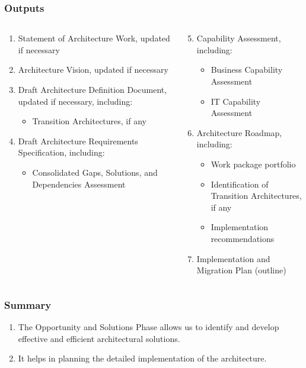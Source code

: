 \documentclass[aspectratio=169, table]{beamer}
\begin{document}
	\begin{frame}
		\frametitle{Outputs}
		\vspace{25pt}
		\begin{columns}[onlytextwidth]
			\begin{column}{0.50\textwidth}
				\begin{enumerate}
					\item Statement of Architecture Work, updated if necessary
					\item Architecture Vision, updated if necessary
					\item Draft Architecture Definition Document, updated if necessary, including:
					\begin{itemize}
						\item Transition Architectures, if any
					\end{itemize}
					\item Draft Architecture Requirements Specification, including:
					\begin{itemize}
						\item Consolidated Gaps, Solutions, and Dependencies Assessment
					\end{itemize}
				\end{enumerate}
				
			\end{column}
			\begin{column}{0.50\textwidth}
				\begin{enumerate}
					\setcounter{enumi}{4}
					\item Capability Assessment, including:
					\begin{itemize}
						\item Business Capability Assessment
						\item IT Capability Assessment
					\end{itemize}
					\item Architecture Roadmap, including:
					\begin{itemize}
						\item Work package portfolio
						\item Identification of Transition Architectures, if any
						\item Implementation recommendations
					\end{itemize}
					\item Implementation and Migration Plan (outline)
				\end{enumerate}
			\end{column}
		\end{columns}
	\end{frame}
	
	
	\begin{frame}
		\frametitle{Summary}
		\begin{enumerate}
			\item The Opportunity and Solutions Phase allows us to identify and develop effective and efficient architectural solutions. 
			\item It helps in planning the detailed implementation of the architecture.
		\end{enumerate}
	\end{frame}
	
\end{document}
